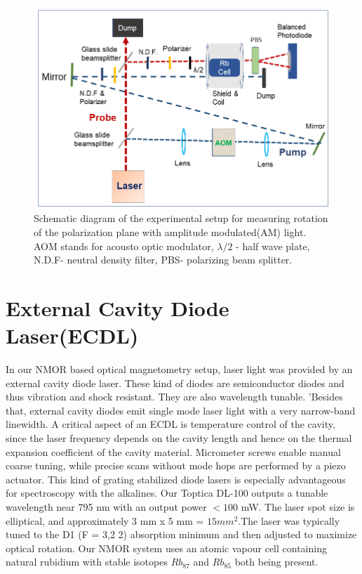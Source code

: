 \documentclass[12pt]{report}
\begin{document}
\begin{figure}[h]
\centering
\includegraphics[width=0.95\linewidth]{figures/experimental_setup}
\caption{Schematic diagram of the experimental setup for measuring rotation of the polarization plane with amplitude modulated(AM) light. AOM stands for acousto optic modulator, $\lambda/2$ - half wave plate, N.D.F- neutral density filter, PBS- polarizing beam splitter.}
\end{figure}
\section{External Cavity Diode Laser(ECDL)}
\bigskip
In our NMOR based optical magnetometry setup, laser light was provided by an external cavity diode laser. These kind of diodes are semiconductor diodes and thus vibration and shock resistant. They are also wavelength tunable. ’Besides that, external cavity diodes emit single mode laser light with a very narrow-band linewidth. A critical aspect of an ECDL is temperature control of the cavity, since the laser frequency depends on the cavity length and hence on the thermal expansion coefficient of the cavity material. Micrometer screws enable manual coarse tuning, while precise scans without mode hops are performed by a piezo actuator. This kind of grating stabilized diode lasers is especially advantageous for spectroscopy with the alkalines. Our Toptica DL-100 outputs a tunable wavelength near 795 nm with an output power $<100$ mW. The laser spot size is elliptical, and approximately 3 mm x 5 mm = $15 mm^2$.The laser was typically tuned to the D1 (F = 3,2 2) absorption minimum and then adjusted to maximize optical rotation. Our NMOR system uses an atomic vapour cell containing natural rubidium with stable isotopes $Rb_{87}$ and $Rb_{85}$ both being present.
\end{document}
